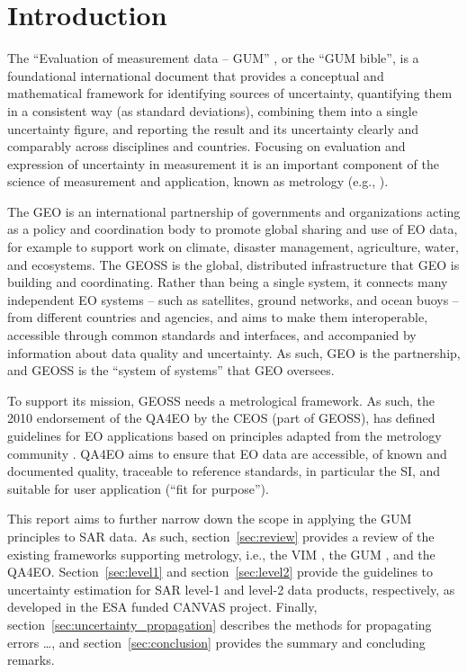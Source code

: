 \section{Introduction}

The ``Evaluation of measurement data -- \ac{GUM}'' \cite{JCGMGUM}, or the
``\ac{GUM} bible'', is a foundational international document that provides a
conceptual and mathematical framework for identifying sources of uncertainty,
quantifying them in a consistent way (as standard deviations), combining them
into a single uncertainty figure, and reporting the result and its uncertainty
clearly and comparably across disciplines and countries. Focusing on evaluation
and expression of uncertainty in measurement it is an important component of
the science of measurement and application, known as \gls{metrology} (e.g.,
\cite{JCGMVIM}).

The \ac{GEO} is an international partnership of governments and organizations
acting as a policy and coordination body to promote global sharing and use of
\ac{EO} data, for example to support work on climate, disaster management,
agriculture, water, and ecosystems. The \ac{GEOSS} is the global, distributed
infrastructure that \ac{GEO} is building and coordinating.  Rather than being a
single system, it connects many independent \ac{EO} systems -- such as
satellites, ground networks, and ocean buoys -- from different countries and
agencies, and aims to make them \gls{interoperable}, accessible through common
standards and interfaces, and accompanied by information about data quality and
uncertainty. As such, \ac{GEO} is the partnership, and \ac{GEOSS} is the
``system of systems'' that \ac{GEO} oversees.

To support its mission, \ac{GEOSS} needs a metrological framework. As such, the
2010 endorsement of the \ac{QA4EO} by the \ac{CEOS} (part of \ac{GEOSS}), has
defined guidelines for \ac{EO} applications based on principles adapted from
the metrology community \cite{QA4EO1}. \ac{QA4EO} aims to ensure that \ac{EO}
data are accessible, of known and documented quality, traceable to reference
standards, in particular the \ac{SI}, and suitable for user application
(``fit for purpose''). 

This report aims to further narrow down the scope in applying the \ac{GUM}
principles to \ac{SAR} data. As such, section~\ref{sec:review} provides a
review of the existing frameworks supporting \gls{metrology}, i.e., the
\ac{VIM} \cite{JCGMVIM}, the \ac{GUM} \cite{JCGMGUM}, and the \ac{QA4EO}.
Section~\ref{sec:level1} and section~\ref{sec:level2} provide the guidelines to
uncertainty estimation for SAR level-1 and level-2 data products, respectively,
as developed in the \ac{ESA} funded \ac{CANVAS} project. Finally,
section~\ref{sec:uncertainty_propagation} describes the methods for propagating
errors \ldots, and section~\ref{sec:conclusion} provides the summary and
concluding remarks.

